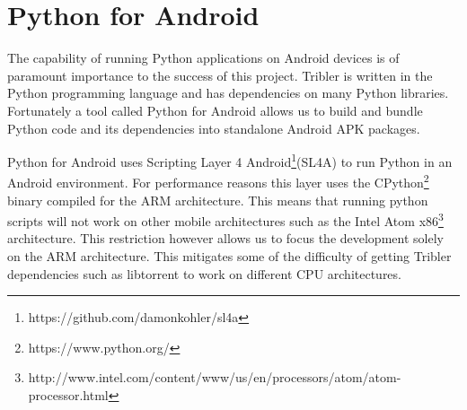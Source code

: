 \section{Python for Android}
	\label{sec:p4a}
	The capability of running Python applications on Android devices is of paramount importance to the success of this project. Tribler is written in the Python programming language and has dependencies on many Python libraries. Fortunately a tool called Python for Android allows us to build and bundle Python code and its dependencies into standalone Android APK packages.

	Python for Android uses Scripting Layer 4 Android\footnote{https://github.com/damonkohler/sl4a}(SL4A) to run Python in an Android environment. For performance reasons this layer uses the CPython\footnote{https://www.python.org/} binary compiled for the ARM architecture. This means that running python scripts will not work on other mobile architectures such as the Intel Atom x86\footnote{http://www.intel.com/content/www/us/en/processors/atom/atom-processor.html} architecture. This restriction however allows us to focus the development solely on the ARM architecture. This mitigates some of the difficulty of getting Tribler dependencies such as libtorrent to work on different CPU architectures.
